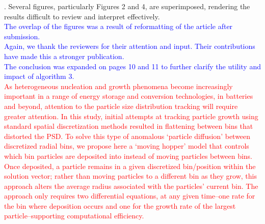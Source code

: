 \documentclass[12 pt]{article}    %
\begin{document}
. Several figures, particularly Figures 2 and 4, are superimposed, rendering the results difficult to review and interpret effectively. \\

\noindent\textcolor{blue}{The overlap of the figures was a result of reformatting of the article after submission.} \\

\noindent\textcolor{blue}{Again, we thank the reviewers for their attention and input. Their contributions have made this a stronger publication.} \\

\noindent\textcolor{blue}{The conclusion was expanded on pages 10 and 11 to further clarify the utility and impact of algorithm 3.} \\
\textcolor{red}{As heterogeneous nucleation and growth phenomena become increasingly important in a range of energy storage and conversion technologies, in batteries and beyond, attention to the particle size distribution tracking will require greater attention. In this study, initial attempts at tracking particle growth using standard spatial discretization methods resulted in flattening between bins that distorted the PSD. To solve this type of anomalous `particle diffusion' between discretized radial bins, we propose here a `moving hopper' model that controls which bin particles are deposited into instead of moving particles between bins. Once deposited, a particle remains in a given discretized bin/position within the solution vector; rather than moving particles to a different bin as they grow, this approach alters the average radius associated with the particles' current bin. The approach only requires two differential equations, at any given time--one rate for the bin where deposition occurs and one for the growth rate of the largest particle--supporting computational efficiency.}



\end{document}
